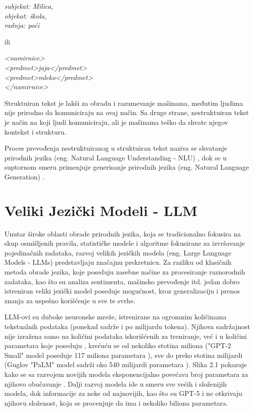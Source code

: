 \documentclass[12pt,oneside]{memoir}
\begin{document}
\vspace{1em}
\hspace{2em} \parbox{0.8\linewidth}{%
	\textit{%
		{subjekat: Milica,} \\
		{objekat: škola,} \\
		{radnja: poći}%
	}%
}
\vspace{1em}

ili

\vspace{1em}
\hspace{2em} \parbox{0.8\linewidth}{%
	\textit{%
		<namirnice> \\
		<predmet>jaja</predmet> \\ 
		<predmet>mleko</predmet> \\
		</namirnice>
	}%
}

\vspace{1em}

Struktuiran tekst je lakši za obradu i razumevanje mašinama, međutim ljudima nije prirodno da komuniciraju na ovaj način. Sa druge strane, nestruktuiran tekst je način na koji ljudi komuniciraju, ali je mašinama teško da shvate njegov kontekst i strukturu.

Proces prevođenja nestruktuiranog u struktuiran tekst naziva se shvatanje prirodnih jezika (eng. Natural Language Understanding - NLU) \cite{NLU}, dok se u suptornom smeru primenjuje generisanje prirodnih jezika (eng. Natural Language Generation) \cite{NLG}. 

\section{Veliki Jezički Modeli - LLM}

Unutar široke oblasti obrade prirodnih jezika, koja se tradicionalno fokusira na skup osmišljenih pravila, statističke modele i algoritme fokusirane za izvršavanje pojedinačnih zadataka, razvoj velikih jezičkih modela (eng. Large Language Models - LLMs) predstavljaju značajnu prekretnicu. Za razliku od klasičnih metoda obrade jezika, koje poseduju zasebne načine za procesiranje raznorodnih zadataka, kao što su analiza sentimenta, mašinsko prevođenje itd. jedan dobro istreniran veliki jezički model poseduje mogućnost, kroz generalizaciju i prenos znanja za uspešno korišćenje u sve te svrhe.

LLM-ovi su duboke neuronske mreže, istrenirane na ogromnim količinama tekstualnih podataka (ponekad sadrže i po milijardu tokena). Njihova sadržajnost nije izražena samo na količini podataka iskorišćenih za treniranje, već i u količini parametara koje poseduju , krećuću se od nekoliko stotina miliona ("GPT-2 Small" model poseduje 117 miliona parametara \cite{LLMListHuggingFace}), sve do preko stotina milijardi (Guglov "PaLM" model sadrži oko 540 milijardi parametara \cite{PalmLLM}). Slika 2.1 pokazuje kako se sa razvojem novijih modela eksponencijalno povećava broj parametara za njihovo obučavanje \cite{LLMParameters}. Dalji razvoj modela ide u smeru sve većih i složenijih modela, dok informacije za neke od najnovijih, kao što su GPT-5 \cite{GPT5} i ne otkrivaju njihovu složenost, koja se procenjuje da ima i nekoliko biliona parametara. 
\end{document}

